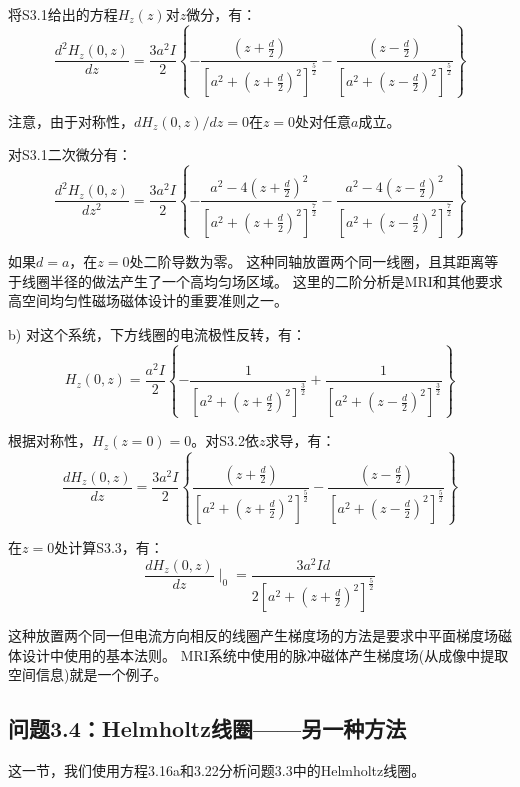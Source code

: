 将S3.1给出的方程$H_z(z)$对$z$微分，有：
\begin{equation*}
\frac{d^2H_z(0,z)}{dz}=\frac{3a^2I}{2}\left\{{-\frac{(z+\frac{d}{2})}{[a^2+(z+\frac{d}{2})^2]^\frac{5}{2}}-\frac{(z-\frac{d}{2})}{[a^2+(z-\frac{d}{2})^2]^\frac{5}{2}}}\right\}
\end{equation*}

注意，由于对称性，$dH_z(0,z)/dz=0$在$z=0$处对任意$a$成立。

对S3.1二次微分有：
\begin{equation*}
\frac{d^2H_z(0,z)}{dz^2}=\frac{3a^2I}{2}\left\{{-\frac{a^2-4(z+\frac{d}{2})^2}{[a^2+(z+\frac{d}{2})^2]^\frac{7}{2}}}
-\frac{a^2-4(z-\frac{d}{2})^2}{[a^2+(z-\frac{d}{2})^2]^\frac{7}{2}}\right\}
\end{equation*}

如果$d = a$，在$z = 0$处二阶导数为零。
这种同轴放置两个同一线圈，且其距离等于线圈半径的做法产生了一个高均匀场区域。
这里的二阶分析是MRI和其他要求高空间均匀性磁场磁体设计的重要准则之一。

b) 对这个系统，下方线圈的电流极性反转，有：
\begin{equation*}%
H_z(0,z)=\frac{a^2I}{2}\left\{{-\frac{1}{[a^2+(z+\frac{d}{2})^2]^\frac{3}{2}}+\frac{1}{[a^2+(z-\frac{d}{2})^2]^\frac{3}{2}}}\right\} \tag{S3.2}
\end{equation*}

根据对称性，$H_z(z=0)=0$。对S3.2依$z$求导，有：
\begin{equation*}%
\frac{dH_z(0,z)}{dz}=\frac{3a^2I}{2}\left\{{\frac{(z+\frac{d}{2})}{[a^2+(z+\frac{d}{2})^2]^\frac{5}{2}}-\frac{(z-\frac{d}{2})}{[a^2+(z-\frac{d}{2})^2]^\frac{5}{2}}}\right\} \tag{S3.3}
\end{equation*}

在$z=0$处计算S3.3，有：
\begin{equation*}
\frac{dH_z(0,z)}{dz}\mid_0=\frac{3a^2Id}{2[a^2+(z+\frac{d}{2})^2]^\frac{5}{2}}
\end{equation*}

这种放置两个同一但电流方向相反的线圈产生梯度场的方法是要求中平面梯度场磁体设计中使用的基本法则。
MRI系统中使用的脉冲磁体产生梯度场(从成像中提取空间信息)就是一个例子。


\subsection{问题3.4：Helmholtz线圈——另一种方法}
这一节，我们使用方程3.16a和3.22分析问题3.3中的Helmholtz线圈。

